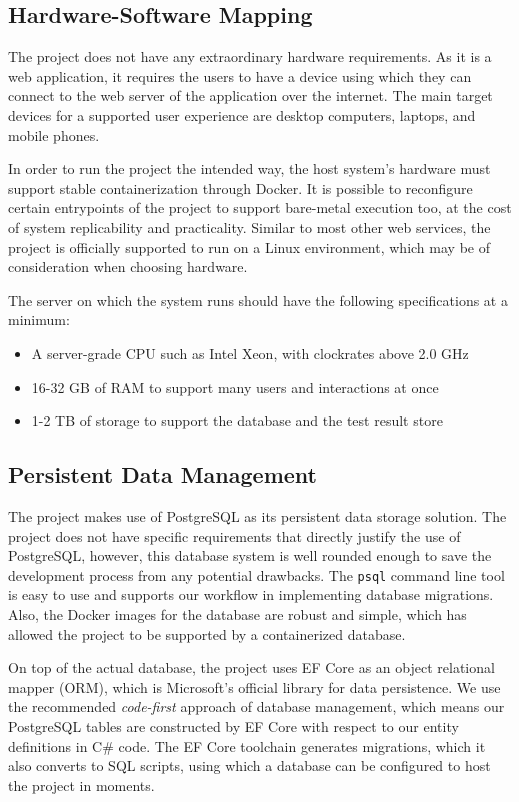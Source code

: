 \documentclass[a4paper, 12pt, titlepage]{article}
\begin{document}
  \subsection{Hardware-Software Mapping}

  The project does not have any extraordinary hardware requirements.
  As it is a web application, it requires the users to have a device using which they can
  connect to the web server of the application over the internet.
  The main target devices for a supported user experience are desktop computers, laptops, and mobile phones.

  In order to run the project the intended way, the host system's hardware must support stable containerization through Docker.
  It is possible to reconfigure certain entrypoints of the project to support bare-metal execution too, at the cost of
  system replicability and practicality.
  Similar to most other web services, the project is officially supported to run on a Linux environment, which
  may be of consideration when choosing hardware.

  The server on which the system runs should have the following specifications at a minimum:

  \begin{itemize}
    \item A server-grade CPU such as Intel Xeon, with clockrates above 2.0 GHz
    \item 16-32 GB of RAM to support many users and interactions at once
    \item 1-2 TB of storage to support the database and the test result store
  \end{itemize}

  \subsection{Persistent Data Management}

  The project makes use of PostgreSQL as its persistent data storage solution.
  The project does not have specific requirements that directly justify the use of PostgreSQL,
  however, this database system is well rounded enough to save the development process from any potential drawbacks.
  The \texttt{psql} command line tool is easy to use and supports our workflow in implementing database migrations.
  Also, the Docker images for the database are robust and simple,
  which has allowed the project to be supported by a containerized database.

  On top of the actual database, the project uses EF Core as an object relational mapper (ORM),
  which is Microsoft's official library for data persistence.
  We use the recommended \textit{code-first} approach of database management, which means our PostgreSQL tables are
  constructed by EF Core with respect to our entity definitions in C\# code.
  The EF Core toolchain generates migrations, which it also converts to SQL scripts,
  using which a database can be configured to host the project in moments.
\end{document}
